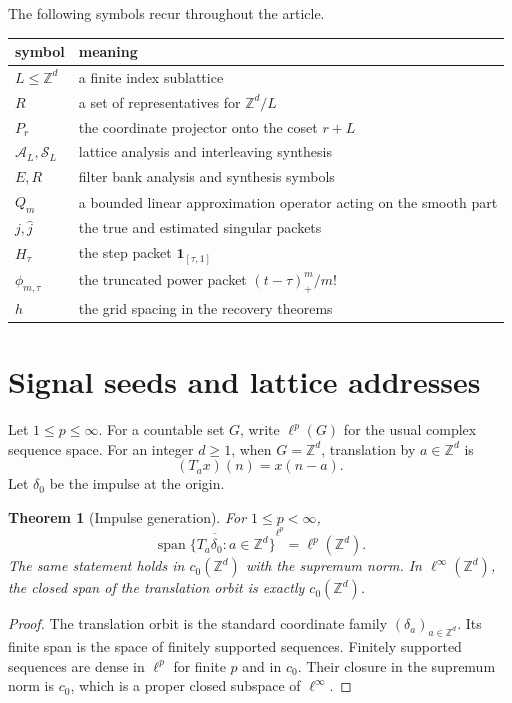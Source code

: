 \documentclass{aomart}
\newtheorem{theorem}{Theorem}[section]
\theoremstyle{definition}
\theoremstyle{remark}
\newcommand{\ZZ}{\mathbb Z}
\newcommand{\Acal}{\mathcal A}
\newcommand{\Scal}{\mathcal S}
\newcommand{\one}{\mathbf 1}
\newcommand{\Span}{\operatorname{span}}
\begin{document}
The following symbols recur throughout the article.
\begin{center}
\begin{tabular}{p{}p{}}
\toprule
symbol & meaning\\
\midrule
\(L\leq\ZZ^d\) & a finite index sublattice\\
\(R\) & a set of representatives for \(\ZZ^d/L\)\\
\(P_r\) & the coordinate projector onto the coset \(r+L\)\\
\(\Acal_L,\Scal_L\) & lattice analysis and interleaving synthesis\\
\(E,R\) & filter bank analysis and synthesis symbols\\
\(Q_m\) & a bounded linear approximation operator acting on the smooth part\\
\(j,\widehat j\) & the true and estimated singular packets\\
\(H_\tau\) & the step packet \(\one_{[\tau,1]}\)\\
\(\phi_{m,\tau}\) & the truncated power packet \((t-\tau)_+^m/m!\)\\
\(h\) & the grid spacing in the recovery theorems\\
\bottomrule
\end{tabular}
\end{center}

\section{Signal seeds and lattice addresses}\label{sec:signal_seeds}

Let \(1\leq p\leq\infty\). For a countable set \(G\), write \(\ell^p(G)\) for the usual complex sequence space. For an integer \(d\geq1\), when \(G=\ZZ^d\), translation by \(a\in\ZZ^d\) is
\[
(T_ax)(n)=x(n-a).
\]
Let \(\delta_0\) be the impulse at the origin.

\begin{theorem}[Impulse generation]\label{thm:impulse_generation}
For \(1\leq p<\infty\),
\[
\overline{\Span\{T_a\delta_0:a\in\ZZ^d\}}^{\ell^p}
=
\ell^p(\ZZ^d).
\]
The same statement holds in \(c_0(\ZZ^d)\) with the supremum norm. In \(\ell^\infty(\ZZ^d)\), the closed span of the translation orbit is exactly \(c_0(\ZZ^d)\).
\end{theorem}

\begin{proof}
The translation orbit is the standard coordinate family \((\delta_a)_{a\in\ZZ^d}\). Its finite span is the space of finitely supported sequences. Finitely supported sequences are dense in \(\ell^p\) for finite \(p\) and in \(c_0\). Their closure in the supremum norm is \(c_0\), which is a proper closed subspace of \(\ell^\infty\).
\end{proof}
\end{document}
